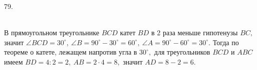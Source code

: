 79. \begin{figure}[ht!]
\end{figure}\\
В прямоугольном треугольнике $BCD$ катет $BD$ в 2 раза меньше гипотенузы $BC,$ значит $\angle BCD=30^\circ,\ \angle B=90^\circ-30^\circ=60^\circ,\ \angle A=90^\circ-60^\circ=30^\circ.$ Тогда по теореме о катете, лежащем напротив угла в $30^\circ,$ для треугольников $BCD$ и $ABC$ имеем $BD=4:2=2,\ AB=2\cdot4=8,$ значит  $AD=8-2=6.$\\
